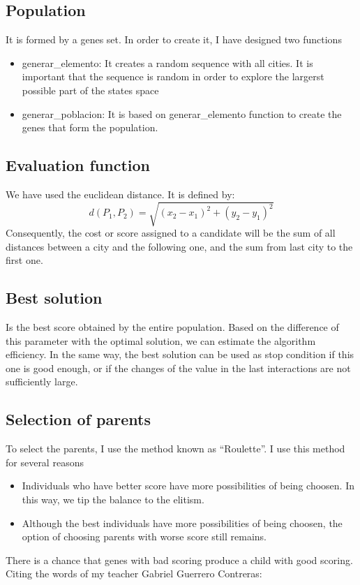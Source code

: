 \documentclass{article}
\begin{document}
\subsection{Population}
It is formed by a genes set. In order to create it, I have designed two functions
    \begin{itemize}
        \item generar\_elemento: It creates a random sequence with all cities. It is important that the sequence is random in order 
        to explore the largerst possible part of the states space
        \item generar\_poblacion: It is based on generar\_elemento function to create the genes that form the population.
    \end{itemize}

\subsection{Evaluation function}
We have used the euclidean distance. It is defined by: 
        \[d(P_1,P_2)= \sqrt{ (x_2 - x_1)^2 +(y_2-y_1)^2} \]
Consequently, the cost or score assigned to a candidate will be the sum of all distances between a city and the following one, 
and the sum from last city to the first one.

\subsection{Best solution}
Is the best score obtained by the entire population. Based on the difference of this parameter with the optimal solution, we can 
estimate the algorithm efficiency. In the same way, the best solution can be used as stop condition if this one is good enough, or 
if the changes of the value in the last  interactions are not sufficiently large.
    
\subsection{Selection of parents}
To select the parents, I use the method known as “Roulette”. I use this method for several reasons
    \begin{itemize}
        \item Individuals who have better score have more possibilities of being choosen. In this way, we tip the balance to the elitism. 
        \item Although the best individuals have more possibilities of being choosen, the option of choosing parents with worse score still remains. 
    \end{itemize}  
    There is a chance that genes with bad scoring produce a child with good scoring. Citing the words of my teacher Gabriel Guerrero Contreras:  \\
        
\end{document}
